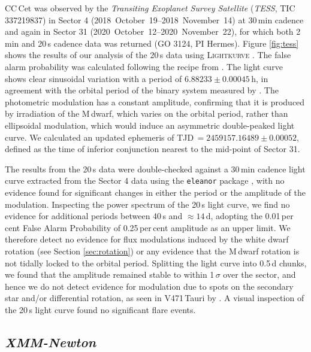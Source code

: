 \documentclass[fleqn,usenatbib]{mnras}
\begin{document}
CC\,Cet was observed by the \textit{Transiting Exoplanet Survey Satellite} (\textit{TESS}, TIC 337219837) in Sector 4 (2018~October~19--2018~November~14) at 30\,min cadence and again in Sector 31 (2020~October~12--2020~November~22), for which both  2\,min and 20\,s cadence data was returned (GO 3124, PI Hermes). Figure \ref{fig:tess} shows the results of our analysis of the 20\,s data using \textsc{Lightkurve} . The false alarm probability was calculated following the recipe from \citet{belletal19-1}. The light curve shows clear sinusoidal variation with a period of $6.88233\pm0.00045$\,h, in agreement with the orbital period of the binary system measured by \citet{somersetal96-2}. The photometric modulation has a constant amplitude, confirming that it is produced by irradiation of the M\,dwarf, which varies on the orbital period, rather than ellipsoidal modulation, which would induce an asymmetric double-peaked light curve. We calculated an updated ephemeris of TJD\,$=2459157.16489\pm0.00052$, defined as the time of inferior conjunction nearest to the mid-point of Sector 31.  

The results from the 20\,s data were double-checked against a 30\,min cadence light curve extracted from the Sector 4 data using the \texttt{eleanor} package \citep{feinsteinetal19-1}, with no evidence found for significant changes in either the
period or the amplitude of the modulation. Inspecting the power spectrum of the 20\,s light curve, we find no evidence for additional periods between 40\,s and $\approx14$\,d, adopting the 0.01\,per\,cent False Alarm Probability of 0.25\,per\,cent amplitude as an upper limit. We therefore detect no evidence for flux modulations induced by the white dwarf rotation (see Section \ref{sec:rotation}) or any evidence that the M\,dwarf rotation is not tidally locked to the orbital period. Splitting the light curve into  0.5\,d chunks, we found that the amplitude remained stable to within 1\,$\sigma$ over the sector, and hence we do not detect evidence for modulation due to spots on the secondary star and/or differential rotation, as seen in V471\,Tauri by \citet{kovarietal21-1}. A visual inspection of the 20\,s light curve found no significant flare events.  



\subsection{\textit{XMM-Newton}}
\end{document}
